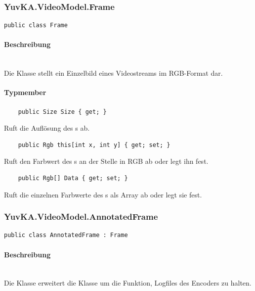 \subsubsection{YuvKA.VideoModel.Frame}

\begin{verbatim}
public class Frame
\end{verbatim}

\paragraph{Beschreibung}~\\
Die Klasse  stellt ein Einzelbild eines Videostreams im RGB-Format dar.

\paragraph{Typmember}
\begin{itemize}

	\begin{verbatim}
	public Size Size { get; }
	\end{verbatim}
	Ruft die Auflösung des s ab.

	\begin{verbatim}
	public Rgb this[int x, int y] { get; set; }
	\end{verbatim}
	Ruft den Farbwert des s an der Stelle  in RGB ab oder legt ihn fest.

	\begin{verbatim}
	public Rgb[] Data { get; set; }
	\end{verbatim}
	Ruft die einzelnen Farbwerte des s als Array ab oder legt sie fest.

\end{itemize}

\subsubsection{YuvKA.VideoModel.AnnotatedFrame}

\begin{verbatim}
public class AnnotatedFrame : Frame
\end{verbatim}

\paragraph{Beschreibung}~\\
Die Klasse  erweitert die Klasse  um die Funktion, Logfiles des Encoders zu halten.

